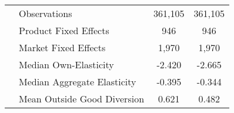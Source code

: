 \begin{tabular}{ll|cc|cc}
\midrule
  & Observations                & \multicolumn{2}{c|}{361{,}105} & \multicolumn{2}{c}{361{,}105} \\
  & Product Fixed Effects       & \multicolumn{2}{c|}{946}    & \multicolumn{2}{c}{946}    \\
  & Market Fixed Effects        & \multicolumn{2}{c|}{1{,}970}   & \multicolumn{2}{c}{1{,}970}   \\
  & Median Own-Elasticity       & \multicolumn{2}{c|}{-2.420} & \multicolumn{2}{c}{-2.665} \\
  & Median Aggregate Elasticity & \multicolumn{2}{c|}{-0.395} & \multicolumn{2}{c}{-0.344} \\
  & Mean Outside Good Diversion & \multicolumn{2}{c|}{0.621}  & \multicolumn{2}{c}{0.482}  \\
\bottomrule
\end{tabular}
